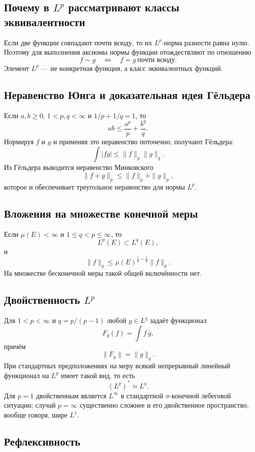 \subsection[Почему в Lp рассматривают классы эквивалентности]{Почему в $L^p$ рассматривают классы эквивалентности}

Если две функции совпадают почти всюду, то их $L^p$-норма разности равна нулю.
Поэтому для выполнения аксиомы нормы функции отождествляют по отношению
\[
    f\sim g\quad\Longleftrightarrow\quad f=g\ \text{почти всюду}.
\]
Элемент $L^p$ --- не конкретная функция, а класс эквивалентных функций.

\subsection{Неравенство Юнга и доказательная идея Гёльдера}

Если $a,b\ge0$, $1<p,q<\infty$ и $1/p+1/q=1$, то
\[
    ab\le \frac{a^p}{p}+\frac{b^q}{q}.
\]
Нормируя $f$ и $g$ и применяя это неравенство поточечно, получают Гёльдера:
\[
    \int |fg|\le \|f\|_p\|g\|_q.
\]
Из Гёльдера выводится неравенство Минковского
\[
    \|f+g\|_p\le\|f\|_p+\|g\|_p,
\]
которое и обеспечивает треугольное неравенство для нормы $L^p$.

\subsection{Вложения на множестве конечной меры}

Если $\mu(E)<\infty$ и $1\le q<p\le\infty$, то
\[
    L^p(E)\subset L^q(E),
\]
и
\[
    \|f\|_q\le \mu(E)^{\frac1q-\frac1p}\|f\|_p.
\]
На множестве бесконечной меры такой общей включённости нет.

\subsection[Двойственность Lp]{Двойственность $L^p$}

Для $1<p<\infty$ и $q=p/(p-1)$ любой $g\in L^q$ задаёт функционал
\[
    F_g(f)=\int f\,\overline g,
\]
причём
\[
    \|F_g\|=\|g\|_q.
\]
При стандартных предположениях на меру всякий непрерывный линейный функционал на
$L^p$ имеет такой вид, то есть
\[
    (L^p)^*\simeq L^q.
\]
Для $p=1$ двойственным является $L^\infty$ в стандартной $\sigma$-конечной
лебеговой ситуации; случай $p=\infty$ существенно сложнее и его двойственное
пространство, вообще говоря, шире $L^1$.

\subsection{Рефлексивность}

